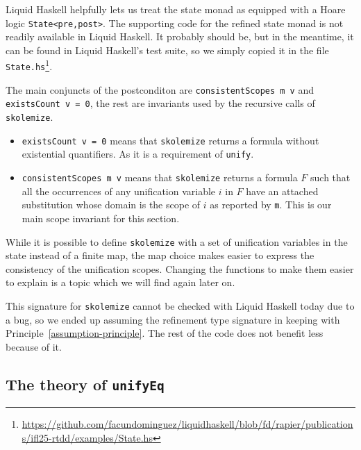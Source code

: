 \documentclass[sigconf, review]{acmart}
\newcommand{\tc}[1]{{\small\texttt{#1}}}
\newcommand{\sourcefile}[1]{\tc{#1}\footnote{\scriptsize\url{https://github.com/facundominguez/liquidhaskell/blob/fd/rapier/publications/ifl25-rtdd/examples/#1}}}
\begin{document}
Liquid Haskell helpfully lets us treat the state monad as equipped with
a Hoare logic \tc{State<pre,post>}. The supporting code for the refined state
monad is not readily available in Liquid Haskell. It probably should be, but in
the meantime, it can be found in Liquid Haskell's test suite, so we simply
copied it in the file \sourcefile{State.hs}.

The main conjuncts of the postconditon are \tc{consistent\-Scopes m v} and
\tc{existsCount v = 0}, the rest are invariants used by the recursive calls of
\tc{skolemize}.
\begin{itemize}
  \item \tc{existsCount v = 0} means that \tc{skolemize} returns a formula without
  existential quantifiers. As it is a requirement of \tc{unify}.
  \item \tc{consistentScopes m v} means that \tc{skolemize} returns a
  formula $F$ such that all the occurrences of any unification variable $i$ in $F$
  have an attached substitution whose domain is the scope of $i$ as reported by \tc{m}. This is our main scope invariant for this
  section.
\end{itemize}

While it is possible to define \tc{skolemize} with a set of unification variables
in the state instead of a finite map, the map choice makes easier to express the
consistency of the unification scopes. Changing the functions to make them easier
to explain is a topic which we will find again later on.

This signature for \tc{skolemize} cannot be checked with Liquid Haskell today
due to
a bug, so we ended up assuming the refinement type signature
in keeping with Principle~\ref{assumption-principle}. The rest
of the code does not benefit less because of it.



\subsection{The theory of \tc{unifyEq}}
\label{checking-unifyEq}
\end{document}
